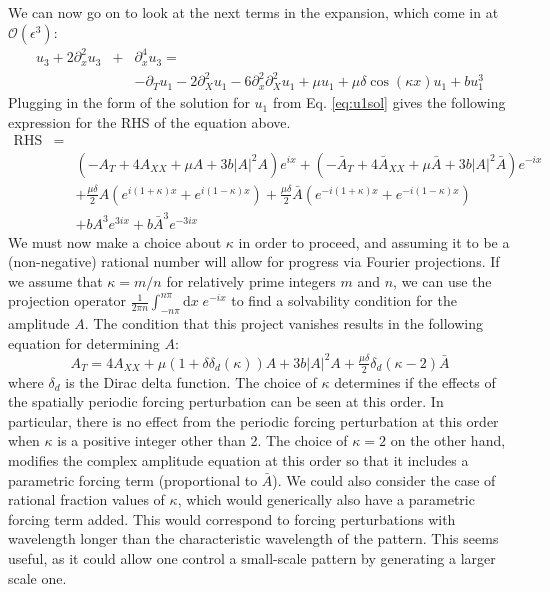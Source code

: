 \documentclass[api,pof,pre,12pt,a4paper]{revtex4-1}
\begin{document}
We can now go on to look at the next terms in the expansion, which come in at $\mathcal{O}(\epsilon^3)$:
\begin{eqnarray}
u_3+2\partial_x^2 u_3 &+& \partial_x^4 u_3 =  \nonumber \\
& & -\partial_T u_1-2\partial_X^2 u_1 - 6\partial_x^2 \partial_X^2 u_1 +\mu u_1 +\mu \delta \cos(\kappa x)  u_1 +b u_1^3
\label{eq:AsympExpEps3}
\end{eqnarray}
Plugging in the form of the solution for $u_1$ from Eq. \ref{eq:u1sol} gives the following expression for the RHS of the equation above.
\begin{eqnarray}
\text{RHS}&=&  \nonumber \\ 
& &\left(-A_T  +4 A_{XX}+\mu A + 3b |A|^2 A\right)e^{ix} + \left(-\bar{A}_T +4 \bar{A}_{XX}+\mu \bar{A} + 3b |A|^2 \bar{A}\right)e^{-ix} \nonumber \\
& &+\frac{\mu\delta}{2} A\left(e^{i(1+\kappa)x}+e^{i(1-\kappa)x} \right) + \frac{\mu\delta}{2} \bar{A}\left( e^{-i(1+\kappa)x}+e^{-i(1-\kappa)x} \right) \nonumber \\
& & +bA^3e^{3ix}+b\bar{A}^3e^{-3ix}
\label{eq:RHSeps3}
\end{eqnarray}
We must now make a choice about $\kappa$ in order to proceed, and  assuming it to be a (non-negative) rational number will allow for progress via Fourier projections.  If we assume that $\kappa=m/n$ for relatively prime integers $m$ and $n$, we can use the projection operator $\tfrac{1}{2\pi n}\int_{-n\pi}^{n\pi} \text{d} x \; e^{-i x}$ to find a solvability condition for the amplitude $A$.  The condition that this project vanishes results in the following equation for determining $A$:
\begin{equation}
A_T= 4 A_{XX}+\mu\left(1+\delta \delta_d(\kappa)\right) A + 3b |A|^2 A+\tfrac{\mu\delta}{2} \delta_d(\kappa-2)\bar{A}
\label{eq:Aeq}
\end{equation}
where $\delta_d$ is the Dirac delta function.  The choice of $\kappa$ determines if the effects of the spatially periodic forcing perturbation can be seen at this order.  In particular, there is no effect from the periodic forcing perturbation at this order when $\kappa$ is a positive integer other than 2.  The choice of $\kappa=2$ on the other hand, modifies the complex amplitude equation at this order so that it includes a parametric forcing term (proportional to $\bar{A}$).  We could also consider the case of rational fraction values of $\kappa$, which would generically also have a parametric forcing term added.  This would correspond to forcing perturbations with wavelength longer than the characteristic wavelength of the pattern. This seems useful, as it could allow one control a small-scale pattern by generating a larger scale one.  
\end{document}
